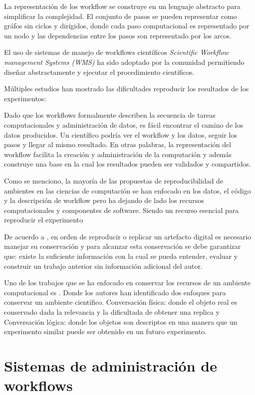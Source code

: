 La representación de los workflow se construye en un lenguaje abstracto para simplificar la complejidad. El conjunto de pasos se pueden representar como gráfos sin ciclos y dirigidos, donde cada paso computacional es representado por un nodo y las dependencias entre los pasos son representado por los arcos.

El uso de sistemas de manejo de workflows científicos \textit{Scientific Workflow management Systems (WMS)} ha sido adoptado por la comunidad permitiendo diseñar abstractamente y ejecutar el procedimiento científicos. 

Múltiples estudios han mostrado las dificultades reproducir los resultados de los experimentos: 






Dado que los workflows formalmente describen la secuencia de tareas computacionales y administración de datos, es fácil encontrar el camino de los datos producidos.
Un científico podría ver el workflow y los datos, seguir los pasos y llegar al mismo resultado. En otras palabras, la representación del workflow facilita la creación y administración de la computación y además construye una base en la cual los resultados pueden ser validados y compartidos.

Como se menciono, la mayoría de las propuestas de reproducibilidad de ambientes en las ciencias de computación se han enfocado en los datos, el código y la descripción de workflow pero ha dejando de lado los recursos computacionales y componentes de software. Siendo un recurso esencial para reproducir el experimento

De acuerdo a \cite{king1995replication}, en orden de reproducir o replicar un artefacto digital es necesario manejar su conservación y para alcanzar esta conservación se debe garantizar que: existe la suficiente información con la cual se pueda entender, evaluar y construir un trabajo anterior sin información adicional del autor. 

Uno de los trabajos que se ha enfocado en conservar los recursos de un ambiente computacional es \cite{santana2017reproducibility}. Donde los autores han identificado dos enfoques para conservar un ambiente científico. Conversación física: donde el objeto real es conservado dada la relevancia y la dificultada de obtener una replica y  Conversación lógica: donde los objetos son descriptos en una manera que un experimento similar puede ser obtenido en un futuro experimento.


\section{Sistemas de administración de workflows}

